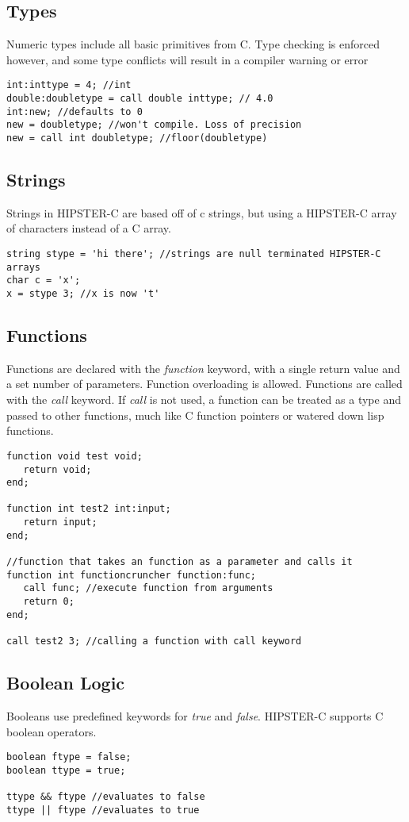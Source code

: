 \documentclass{article}
\begin{document}
\subsection{Types}
Numeric types include all basic primitives from C. Type checking is enforced however, and some type conflicts will result in a compiler warning or error
\begin{verbatim}
int:inttype = 4; //int
double:doubletype = call double inttype; // 4.0 
int:new; //defaults to 0 
new = doubletype; //won't compile. Loss of precision
new = call int doubletype; //floor(doubletype) 
\end{verbatim}


\subsection{Strings}
Strings in HIPSTER-C are based off of c strings, but using a HIPSTER-C array of characters instead of a C array. 
\begin{verbatim}
string stype = 'hi there'; //strings are null terminated HIPSTER-C arrays
char c = 'x';
x = stype 3; //x is now 't'
\end{verbatim}


\subsection{Functions}
Functions are declared with the \textit{function} keyword, with a single return value and a set number of parameters. Function overloading is allowed. Functions are called with the \textit{call} keyword. If \textit{call} is not used, a function can be treated as a type and passed to other functions, much like C function pointers or watered down lisp functions. 
\begin{verbatim}
function void test void; 
   return void;
end;

function int test2 int:input; 
   return input;
end;

//function that takes an function as a parameter and calls it
function int functioncruncher function:func;
   call func; //execute function from arguments 
   return 0;
end; 

call test2 3; //calling a function with call keyword
\end{verbatim}

\subsection{Boolean Logic}
Booleans use predefined keywords for \textit{true} and \textit{false}. HIPSTER-C supports C boolean operators. 
\begin{verbatim}
boolean ftype = false; 
boolean ttype = true; 

ttype && ftype //evaluates to false
ttype || ftype //evaluates to true
\end{verbatim}
\end{document}
